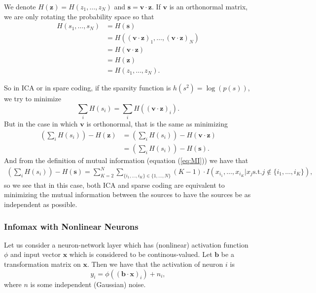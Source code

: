 \documentclass[]{article}
\begin{document}
We denote $H(\bm{z}) = H(z_1,\ldots, z_N)$ and $\bm{s} = \bm{v \cdot z}$.  If $\bm{v}$ is an orthonormal matrix, we are only rotating the probability space so that 
\begin{align}
\label{sameent}
H(s_1, \ldots, s_N) & = H(\bm{s}) \\
& = H((\bm{v\cdot z})_1, \ldots, (\bm{v\cdot z})_N) \\
& = H(\bm{v\cdot z}) \\
& = H(\bm{z}) \\
& = H(z_1,\ldots, z_N) .
\end{align}

So in ICA or in spare coding, if the sparsity function is $h(s^2) = \log(p(s))$, we try to minimize
\begin{equation}
\label{icaopt}
\sum_i H(s_i) = \sum_i H((\bm{v\cdot z})_i) .
\end{equation}
But in the case in which $\bm{v}$ is orthonormal, that is the same as minimizing
\begin{align}
\label{caopt2}
\left(\sum_i H(s_i)\right) - H(\bm{z}) &  = \left(\sum_i H(s_i)\right) - H(\bm{v\cdot z}) \\
& = \left(\sum_i H(s_i)\right) - H(\bm{s}). 
\end{align}
And from the definition of mutual information (equation (\ref{eq:MI})) we have that
\begin{align}
\label{icaopt3}
\left(\sum_i H(s_i)\right) - H(\bm{s}) = \sum_{K=2}^N \sum_{\{i_1,\ldots,i_K \}\in \{1,\ldots,N\}} (K-1) \cdot I(x_{i_1},\ldots,x_{i_K}|x_j \text{s.t.} j\notin\{i_1,\ldots,i_K \}), 
\end{align}
so we see that in this case, both ICA and sparse coding are equivalent to minimizing the mutual information between the sources to have the sources be as independent as possible. 


\subsubsection{Infomax with Nonlinear Neurons}
\label{infomax}

Let us consider a neuron-network layer which has (nonlinear) activation function $\phi$ and input vector $\bm{x}$ which is considered to be continous-valued. Let $\bm{b}$ be a transformation matrix on $\bm{x}$. Then we have that the activation of neuron $i$ is
\begin{equation}
\label{neuronact}
y_i = \phi((\bm{b \cdot x})_i) +n_i,
\end{equation}
where $n$ is some independent (Gaussian) noise. 
\end{document}
